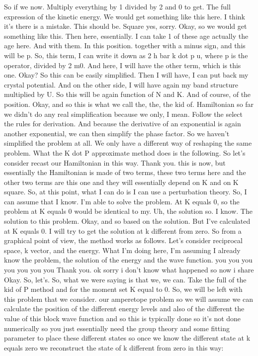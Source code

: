 So if we now. Multiply everything by 1 divided by 2 and 0 to get. The full expression of the kinetic energy. We would get something like this here. I think it's there is a mistake. This should be. Square yes, sorry. Okay, so we would get something like this. Then here, essentially. I can take 1 of these age actually the age here. And with them. In this position. together with a minus sign, and this will be p. So, this term, I can write it down as 2 h bar k dot p u, where p is the operator, divided by 2 m0. And here, I will have the other term, which is this one. Okay? So this can be easily simplified. Then I will have, I can put back my crystal potential. And on the other side, I will have again my band structure multiplied by U. So this will be again function of N and K. And of course, of the position. Okay, and so this is what we call the, the, the kid of. Hamiltonian so far we didn't do any real simplification because we only, I mean. Follow the select the rules for derivation. And because the derivative of an exponential is again another exponential, we can then simplify the phase factor. So we haven't simplified the problem at all. We only have a different way of reshaping the same problem. What the K dot P approximate method does is the following. So let's consider recast our Hamiltonian in this way. Thank you. this is now, but essentially the Hamiltonian is made of two terms, these two terms here and the other two terms are this one and they will essentially depend on K and on K square. So, at this point, what I can do is I can use a perturbation theory. So, I can assume that I know. I'm able to solve the problem. At K equals 0, so the problem at K equals 0 would be identical to my. Uh, the solution so. I know. The solution to this problem. Okay, and so based on the solution. But I've calculated at K equals 0. I will try to get the solution at k different from zero. So from a graphical point of view, the method works as follows. Let's consider reciprocal space, k vector, and the energy. What I'm doing here, I'm assuming I already know the problem, the solution of the energy and the wave function. you you you you you you you Thank you. ok sorry i don't know what happened so now i share Okay. So, let's. So, what we were saying is that we, we can. Take the full of the kid of P method and for the moment set K equal to 0. So, we will be left with this problem that we consider. our amperetope problem so we will assume we can calculate the position of the different energy levels and also of the different the value of this block wave function and so this is typically done so it's not done numerically so you just essentially need the group theory and some fitting parameter to place these different states so once we know the different state at k equals zero we reconstruct the state of k different from zero in this way:
